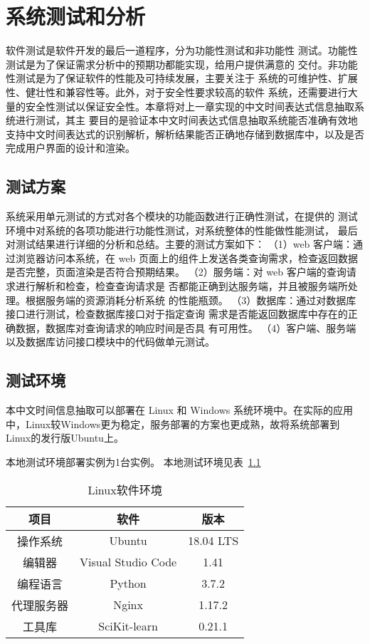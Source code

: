 
\chapter{系统测试和分析}

软件测试是软件开发的最后一道程序，分为功能性测试和非功能性
测试。功能性测试是为了保证需求分析中的预期功都能实现，给用户提供满意的
交付。非功能性测试是为了保证软件的性能及可持续发展，主要关注于
系统的可维护性、扩展性、健壮性和兼容性等。此外，对于安全性要求较高的软件
系统，还需要进行大量的安全性测试以保证安全性。本章将对上一章实现的中文时间表达式信息抽取系统进行测试，其主
要目的是验证本中文时间表达式信息抽取系统能否准确有效地支持中文时间表达式的识别解析，解析结果能否正确地存储到数据库中，以及是否完成用户界面的设计和渲染。

\section{测试方案}

系统采用单元测试的方式对各个模块的功能函数进行正确性测试，在提供的
测试环境中对系统的各项功能进行功能性测试，对系统整体的性能做性能测试，
最后对测试结果进行详细的分析和总结。主要的测试方案如下：
（1）web 客户端：通过浏览器访问本系统，在 web 页面上的组件上发送各类查询需求，检查返回数据是否完整，页面渲染是否符合预期结果。
（2）服务端：对 web 客户端的查询请求进行解析和检查，检查查询请求是
否都能正确到达服务端，并且被服务端所处理。根据服务端的资源消耗分析系统
的性能瓶颈。
（3）数据库：通过对数据库接口进行测试，检查数据库接口对于指定查询
需求是否能返回数据库中存在的正确数据，数据库对查询请求的响应时间是否具
有可用性。
（4）客户端、服务端以及数据库访问接口模块中的代码做单元测试。

\section{测试环境}

本中文时间信息抽取可以部署在 Linux 和 Windows 系统环境中。在实际的应用
中，Linux较Windows更为稳定，服务部署的方案也更成熟，故将系统部署到Linux的发行版Ubuntu上。

本地测试环境部署实例为1台实例。 本地测试环境见表~\ref{tab:local_test}

\begin{table}[h]
    \centering
    \caption{Linux软件环境}
    \begin{tabular}{|*{3}{c|}}
        \hline
        项目       & 软件               & 版本      \\
        \hline
        操作系统   & Ubuntu             & 18.04 LTS \\
        \hline
        编辑器     & Visual Studio Code & 1.41      \\
        编程语言   & Python             & 3.7.2     \\
        \hline
        代理服务器 & Nginx              & 1.17.2    \\
        \hline
        工具库     & SciKit-learn       & 0.21.1    \\
        \hline
    \end{tabular}
    \label{tab:local_test}
\end{table}

